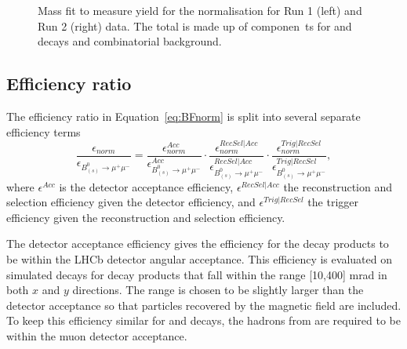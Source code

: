 {{\begin{figure}[tbp]
\begin{subfigure}[b]{0.48\textwidth}
   \end{subfigure}
    \caption{Mass fit to measure \bdkpi yield for the normalisation for Run 1 (left) and Run 2 (right) data. The total \pdf is made up of componen\
ts for \bdkpi and \bskpi decays and combinatorial background.}
    \label{fig:Bdkpiyield}
\end{figure}

\subsection{Efficiency ratio}
\label{sec:effratio}
The efficiency ratio in Equation~\ref{eq:BFnorm} is split into several separate efficiency terms 
\begin{equation}
\frac{\epsilon_{norm}}{\epsilon_{B^{0}_{(s)} \to \mu^{+} \mu^{-}}}  =  \frac{\epsilon^{Acc}_{norm}}{\epsilon^{Acc}_{B^{0}_{(s)} \to \mu^{+} \mu^{-}}} \cdot \frac{\epsilon^{RecSel|Acc}_{norm}}{\epsilon^{RecSel|Acc}_{B^{0}_{(s)} \to \mu^{+} \mu^{-}}} \cdot \frac{\epsilon^{Trig|RecSel}_{norm}}{\epsilon^{Trig|RecSel}_{B^{0}_{(s)} \to \mu^{+} \mu^{-}}},
\label{eq:BFnormDetailed}
\end{equation}
where $\epsilon^{Acc}$ is the detector acceptance efficiency, $\epsilon^{RecSel|Acc}$ the reconstruction and selection efficiency given the detector efficiency, and $\epsilon^{Trig|RecSel}$ the trigger efficiency given the reconstruction and selection efficiency. 

The detector acceptance efficiency gives the efficiency for the decay products to be within the LHCb detector angular acceptance. This efficiency is evaluated on simulated decays for decay products that fall within the range [10,400] mrad in both $x$ and $y$ directions. The range is chosen to be slightly larger than the detector acceptance so that particles recovered by the magnetic field are included. To keep this efficiency similar for \bmumu and \bdkpi decays, the hadrons from \bdkpi are required to be within the muon detector acceptance. 

}}
